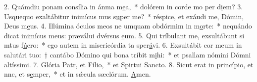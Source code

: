 2. Quámdiu ponam consília in ánma m\uline{e}a,~* dolórem in corde mo per d\uline{i}em?
3. Usquequo exaltábitur inimícus mus s\uline{u}per me?~* réspice, et exáudi me, Dómin, Deus m\uline{e}us.
4. Illúmina óculos meos ne umquam obdórmim in m\uline{o}rte:~* nequándo dicat inimícus meus: præválui dvérsus \uline{e}um.
5. Qui tríbulant me, exsultábunt si mtus f\uline{ú}ero:~* ego autem in misericórdia ta sper\uline{á}vi.
6. Exsultábit cor meum in salutári tuo:~† cantábo Dómino qui bona tríbit m\uline{i}hi:~* et psallam nómini Dómni alt\uline{í}ssimi.
7. Glória Patr, et F\uline{í}lio,~* et Spirtui S\uline{a}ncto.
8. Sicut erat in princípio, et nnc, et s\uline{e}mper,~* et in sǽcula sæclórum. \uline{A}men.

